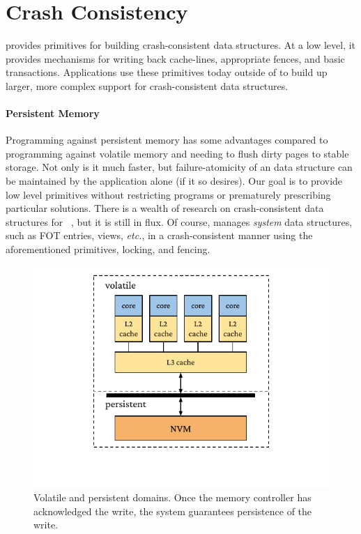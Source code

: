 \section{Crash Consistency}
\label{sec:crash}

\Twizzler provides primitives for building crash-consistent data structures. At a low level,
it provides mechanisms for writing back cache-lines, appropriate fences, and basic transactions.
Applications use these primitives today outside of \Twizzler to build up larger, more complex support for
crash-consistent data structures.


\paragraph{Persistent Memory}

Programming against persistent memory has some advantages compared to programming against volatile memory and needing to
flush dirty pages to stable storage. Not only is it much faster, but failure-atomicity of an \NVM data structure can be
maintained by the application alone (if it so desires).
Our goal is to provide low level primitives without restricting programs or prematurely
prescribing particular solutions. There is a wealth of research on crash-consistent
data structures for
\NVM~\cite{condit:sosp09,coburn:asplos11,volos:asplos11,dulloor:eurosys14,narayanan:asplos12,ni:hotstorage18,ni:micro19,ogleari:hpca18,lu2014loose},
but it is still in flux. Of course, \Twizzler manages \emph{system} data structures,
such as FOT entries, views, \emph{etc.}, in a
crash-consistent manner using the aforementioned primitives, locking, and fencing.

\begin{figure}
    \centering
    \includegraphics[width=\linewidth]{fig/vpdomains.pdf}
    \caption[Volatile and persistent domains]{Volatile and persistent domains. Once the memory controller has acknowledged the write, the system guarantees persistence of the write.}
    \label{fig:vpdomains}
\end{figure}



